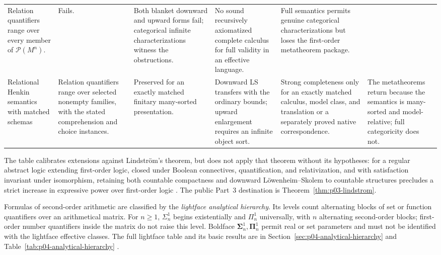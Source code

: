 \begin{landscape}
\begin{longtable}{@{}p{.85in}p{1.25in}p{.80in}p{1.05in}p{1.55in}p{1.55in}@{}}
Relation quantifiers range over every member of \(\mathcal P(M^n)\). &
Fails. &
Both blanket downward and upward forms fail; categorical infinite
characterizations witness the obstructions. &
No sound recursively axiomatized complete calculus for full validity in an
effective language. &
Full semantics permits genuine categorical characterizations but loses the
first-order metatheorem package. \\
\addlinespace
Relational Henkin semantics with matched schemas &
Relation quantifiers range over selected nonempty families, with the stated
comprehension and choice instances. &
Preserved for an exactly matched finitary many-sorted presentation. &
Downward LS transfers with the ordinary bounds; upward enlargement requires
an infinite object sort. &
Strong completeness only for an exactly matched calculus, model class, and
translation or a separately proved native correspondence. &
The metatheorems return because the semantics is many-sorted and
model-relative; full categoricity does not. \\
\bottomrule
\end{longtable}
\endgroup
\end{landscape}

The table calibrates extensions against Lindstr\"om's theorem, but does not
apply that theorem without its hypotheses: for a regular abstract logic
extending first-order logic, closed under Boolean connectives, quantification,
and relativization, and with satisfaction invariant under isomorphism,
retaining both countable compactness and downward L\"owenheim--Skolem to
countable structures precludes a strict increase in expressive power over
first-order logic \cite{Lindstrom1969}.  The public Part~3 destination is
Theorem~\ref{thm:p03-lindstrom}.

Formulas of second-order arithmetic are classified by the
\emph{lightface analytical hierarchy}.  Its levels count alternating blocks of set or function
quantifiers over an arithmetical matrix.  For \(n\geq1\), \(\Sigma^1_n\)
begins existentially and \(\Pi^1_n\) universally, with \(n\) alternating
second-order blocks;
first-order number quantifiers inside the matrix do not raise this level.
Boldface \(\boldsymbol{\Sigma}^1_n,\boldsymbol{\Pi}^1_n\) permit real or set
parameters and must not be identified with the lightface effective classes.
The full lightface table and its basic results are in
Section~\ref{sec:p04-analytical-hierarchy} and
Table~\ref{tab:p04-analytical-hierarchy}
\cite{Kleene1952,Rogers1967,Moschovakis2009}.
